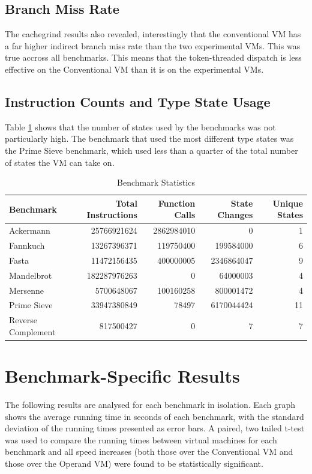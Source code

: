 \documentclass[english,a4paper,12pt]{report}
\begin{document}
\subsection{Branch Miss Rate}
The cachegrind results also revealed, interestingly that the
conventional VM has a far higher indirect branch miss rate than the
two experimental VMs. This was true accross all benchmarks. This means
that the token-threaded dispatch is less effective on the Conventional
VM than it is on the experimental VMs. %

\subsection{Instruction Counts and Type State Usage}
Table \ref{tab:stats} shows that the number of states used by the
benchmarks was not particularly high. The benchmark that used the most
different type states was the Prime Sieve benchmark, which used less
than a quarter of the total number of states the VM can take on.

\begin{table}[!htb]
  \centering
  \begin{center}
    \begin{tabular}{lrrrr}
      Benchmark & Total Instructions & Function Calls & State Changes & Unique States\\
      \hline
      Ackermann & 25766921624 & 2862984010 & 0 & 1\\
      Fannkuch & 13267396371 & 119750400 & 199584000 & 6\\
      Fasta & 11472156435 & 400000005 & 2346864047 & 9\\
      Mandelbrot & 182287976263 & 0 & 64000003 & 4\\
      Mersenne & 5700648067 & 100160258 & 800001472 & 4\\
      Prime Sieve & 33947380849 & 78497 & 6170044424 & 11\\
      Reverse Complement & 817500427 & 0 & 7 & 7\\
    \end{tabular}
  \end{center}
  \caption{Benchmark Statistics}
  \label{tab:stats}
\end{table}

\section{Benchmark-Specific Results}

The following results are analysed for each benchmark in
isolation. Each graph shows the average running time in seconds of
each benchmark, with the standard deviation of the running times
presented as error bars. A paired, two tailed t-test was used to
compare the running times between virtual machines for each benchmark
and all speed increases (both those over the Conventional VM and those
over the Operand VM) were found to be statistically significant.
\end{document}

